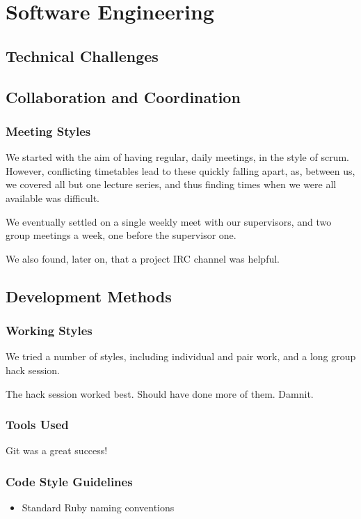 \chapter{Software Engineering}
\section{Technical Challenges}
\section{Collaboration and Coordination}

\subsection{Meeting Styles}
We started with the aim of having regular, daily meetings, in the style of scrum.
However, conflicting timetables lead to these quickly falling apart, as, between us, we covered all but one lecture series, and thus finding times when we were all available was difficult.

We eventually settled on a single weekly meet with our supervisors, and two group meetings a week, one before the supervisor one.

We also found, later on, that a project IRC channel was helpful.


\section{Development Methods}

\subsection{Working Styles}
We tried a number of styles, including individual and pair work, and a long group hack session.

The hack session worked best.
Should have done more of them.
Damnit.

\subsection{Tools Used}
Git was a great success!

\subsection{Code Style Guidelines}
\begin{itemize}
\item Standard Ruby naming conventions
\end{itemize}


